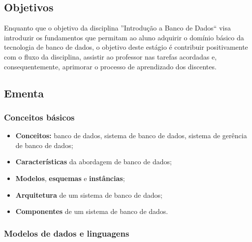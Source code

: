 \documentclass[12pt, a4paper]{article}
\begin{document}
\subsection{Objetivos} \label{subsec:objetivos}

Enquanto que o objetivo da disciplina ''Introdução a Banco de Dados`` visa introduzir os fundamentos que permitam ao aluno adquirir o domínio básico da tecnologia de banco de dados, o objetivo deste estágio é contribuir positivamente com o fluxo da disciplina, assistir ao professor nas tarefas acordadas e, consequentemente, aprimorar o processo de aprendizado dos discentes.


\subsection{Ementa} \label{subsec:ementa}


\subsubsection*{Conceitos básicos} \label{subsubsec:conceitos}

\begin{itemize}\setlength{\itemsep}{0pt}
    \item \textbf{Conceitos:} banco de dados, sistema de banco de dados, sistema de gerência de banco de dados;
    \item \textbf{Características} da abordagem de banco de dados;
    \item \textbf{Modelos}, \textbf{esquemas} e \textbf{instâncias};
    \item \textbf{Arquitetura} de um sistema de banco de dados;
    \item \textbf{Componentes} de um sistema de banco de dados.
\end{itemize}

\subsubsection*{Modelos de dados e linguagens} \label{subsubsec:modelos}
\end{document}
